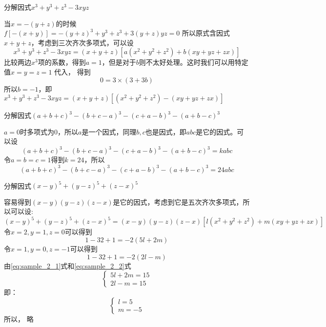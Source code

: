 \documentclass[windows,csize4]{BHCexam}
\begin{document}
\begin{groups}
\begin{questions}[]
        \question[5] 分解因式$x^3+y^3+z^3-3xyz$
        \begin{solution}{0.5cm}
            \methodonly 当$x=-(y+z)$的时候$f[-(x+y)]=-(y+z)^3+y^3+z^3+3(y+z)yz=0$
            所以原式含因式$x+y+z$，考虑到三次齐次多项式，可以设
            \[
                x^3+y^3+z^3-3xyz=(x+y+z)[a(x^2+y^2+z^2)+b(xy+yz+zx)]
            \]
            比较两边$x^3$项的系数，得到$a=1$，但是对于$b$则不太好处理。这时我们可以用特定值$x=y=z=1$ 代入，
            得到
            \[
                0=3\times (3+3b)
            \]
            所以$b=-1$，即$x^3+y^3+z^3-3xyz=(x+y+z)[(x^2+y^2+z^2)-(xy+yz+zx)]$

        \end{solution}
        \vspace{3.5cm}

        \question[5] 分解因式$(a+b+c)^3-(b+c-a)^3-(c+a-b)^3-(a+b-c)^3$
        \begin{solution}{0.5cm}
            \methodonly $a=0$时多项式为$0$，所以$a$是一个因式，同理$b,c$也是因式，即$abc$是它的因式。可以设
            \[
                (a+b+c)^3-(b+c-a)^3-(c+a-b)^3-(a+b-c)^3=kabc
            \]
            令$a=b=c=1$得到$k=24$，所以
            \[
                (a+b+c)^3-(b+c-a)^3-(c+a-b)^3-(a+b-c)^3=24abc
            \]
        \end{solution}
        \vspace{3.5cm}

        \question[5] 分解因式$(x-y)^5+(y-z)^5+(z-x)^5$
        \begin{solution}{0.5cm}
            \methodonly 容易得到$(x-y)(y-z)(z-x)$是它的因式，考虑到它是五次齐次多项式，所以可以设:
            \[
                (x-y)^5+(y-z)^5+(z-x)^5=(x-y)(y-z)(z-x)[l(x^2+y^2+z^2)+m(xy+yz+zx)]
            \]
            令$x=2,y=1,z=0$可以得到
            \begin{equation}
                \label{eq:sample_2_1}
                1-32+1=-2(5l+2m)
            \end{equation}
            令$x=1,y=0,z=-1$可以得到
            \begin{equation}
                \label{eq:sample_2_2}
                1-32+1=-2(2l-m)
            \end{equation}
            由\ref{eq:sample_2_1}式和\ref{eq:sample_2_2}式
            \begin{equation}
                \begin{cases}
                    5l+2m=15 \\
                    2l-m=15
                \end{cases}
            \end{equation}
            即：
            \begin{equation}
                \begin{cases}
                    l=5 \\
                    m=-5
                \end{cases}
            \end{equation}
            所以， 略 
        \end{solution}
        \vspace{3.5cm}


\end{questions}
\end{groups}
\end{document}
